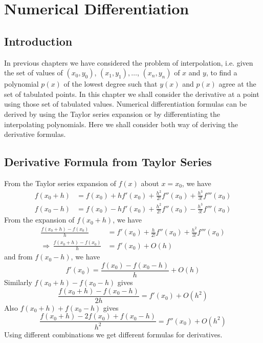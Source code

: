 \documentclass[12pt,class=book,crop=false]{standalone}
\begin{document}
\chapter{Numerical Differentiation}
\section{Introduction}
In previous chapters we have considered the problem of interpolation, i.e. given the set of values of $ (x_0,y_0) $, $ (x_1,y_1),\dots $, $ (x_n,y_n) $ of $ x $ and $ y $, to find a polynomial $ p(x) $ of the lowest degree such that $ y(x) $ and $ p(x) $ agree at the set of tabulated points. In this chapter we shall consider the derivative at a point using those set of tabulated values. Numerical differentiation formulas can be derived by using the Taylor series expansion or by differentiating the interpolating polynomials. Here we shall consider both way of deriving the derivative formulas.
\section{Derivative Formula from Taylor Series}
From the Taylor series expansion of $ f(x) $ about $ x=x_0 $, we have
\begin{align*}
    f(x_0+h) & =f(x_0)+hf'(x_0)+\frac{h^2}{2!} f''(x_0)+\frac{h^3}{3!}f'''(x_0) \\
    f(x_0-h) & =f(x_0)-hf'(x_0)+\frac{h^2}{2!} f''(x_0)-\frac{h^3}{3!}f'''(x_0)
\end{align*}
From the expansion of $ f(x_0+h) $, we have
\begin{align*}
    \frac{f(x_0+h)-f(x_0)}{h}              & =f'(x_0)+\frac{h}{2!}f''(x_0)+\frac{h^2}{3!}f'''(x_0) \\
    \Rightarrow\,\frac{f(x_0+h)-f(x_0)}{h} & =f'(x_0)+O(h)
\end{align*}
and from $ f(x_0-h) $, we have
\[
    f'(x_0)=\frac{f(x_0)-f(x_0-h)}{h}+O(h)
\]
Similarly $ f(x_0+h)-f(x_0-h) $ gives
\[
    \frac{f(x_0+h)-f(x_0-h)}{2h}=f'(x_0)+O(h^2)
\]
Also $ f(x_0+h)+f(x_0-h) $ gives
\[
    \frac{f(x_0+h)-2f(x_0)+f(x_0-h)}{h^2}=f''(x_0)+O(h^2)
\]
Using different combinations we get different formulas for derivatives.
\end{document}
